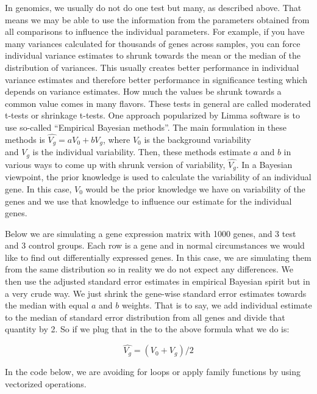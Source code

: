\documentclass[12pt,]{krantz}
\theoremstyle{definition}
\theoremstyle{definition}
\theoremstyle{definition}
\theoremstyle{remark}
\begin{document}
In genomics, we usually do not do one test but many, as described above.
That means we may be able to use the information from the parameters
obtained from all comparisons to influence the individual parameters.
For example, if you have many variances calculated for thousands of
genes across samples, you can force individual variance estimates to
shrunk towards the mean or the median of the distribution of variances.
This usually creates better performance in individual variance estimates
and therefore better performance in significance testing which depends
on variance estimates. How much the values be shrunk towards a common
value comes in many flavors. These tests in general are called moderated
t-tests or shrinkage t-tests. One approach popularized by Limma software
is to use so-called ``Empirical Bayesian methods''. The main formulation
in these methods is \(\hat{V_g} = aV_0 + bV_g\), where \(V_0\) is the
background variability\\
and \(V_g\) is the individual variability. Then, these methods estimate
\(a\) and \(b\) in various ways to come up with shrunk version of
variability, \(\hat{V_g}\). In a Bayesian viewpoint, the prior knowledge
is used to calculate the variability of an individual gene. In this
case, \(V_0\) would be the prior knowledge we have on variability of the
genes and we use that knowledge to influence our estimate for the
individual genes.

Below we are simulating a gene expression matrix with 1000 genes, and 3
test and 3 control groups. Each row is a gene and in normal
circumstances we would like to find out differentially expressed genes.
In this case, we are simulating them from the same distribution so in
reality we do not expect any differences. We then use the adjusted
standard error estimates in empirical Bayesian spirit but in a very
crude way. We just shrink the gene-wise standard error estimates towards
the median with equal \(a\) and \(b\) weights. That is to say, we add
individual estimate to the median of standard error distribution from
all genes and divide that quantity by 2. So if we plug that in the to
the above formula what we do is:

\[ \hat{V_g} = (V_0 + V_g)/2 \]

In the code below, we are avoiding for loops or apply family functions
by using vectorized operations.
\end{document}
